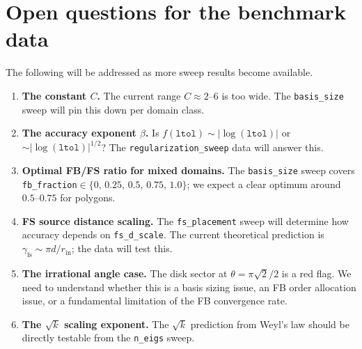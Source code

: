 \documentclass[11pt]{article}
\newcommand{\ltol}{\texttt{ltol}}
\begin{document}
\section{Open questions for the benchmark data}

The following will be addressed as more sweep results become available.

\begin{enumerate}
  \item \textbf{The constant $C$.}  The current range $C\approx 2$--$6$ is too
    wide.  The \texttt{basis\_size} sweep will pin this down per domain class.

  \item \textbf{The accuracy exponent $\beta$.}  Is $f(\ltol)\sim|\log(\ltol)|$
    or $\sim|\log(\ltol)|^{1/2}$?  The \texttt{regularization\_sweep} data will
    answer this.

  \item \textbf{Optimal FB/FS ratio for mixed domains.}  The
    \texttt{basis\_size} sweep covers \texttt{fb\_fraction}$\in\{0,\,0.25,\,0.5,\,0.75,\,1.0\}$;
    we expect a clear optimum around $0.5$--$0.75$ for polygons.

  \item \textbf{FS source distance scaling.}  The \texttt{fs\_placement} sweep
    will determine how accuracy depends on \texttt{fs\_d\_scale}.  The current
    theoretical prediction is $\gamma_{\mathrm{fs}}\sim\pi d/r_{\mathrm{in}}$;
    the data will test this.

  \item \textbf{The irrational angle case.}  The disk sector at
    $\theta=\pi\sqrt{2}/2$ is a red flag.  We need to understand whether this
    is a basis sizing issue, an FB order allocation issue, or a fundamental
    limitation of the FB convergence rate.

  \item \textbf{The $\sqrt{k}$ scaling exponent.}  The $\sqrt{k}$ prediction
    from Weyl's law should be directly testable from the \texttt{n\_eigs} sweep.
\end{enumerate}
\end{document}
